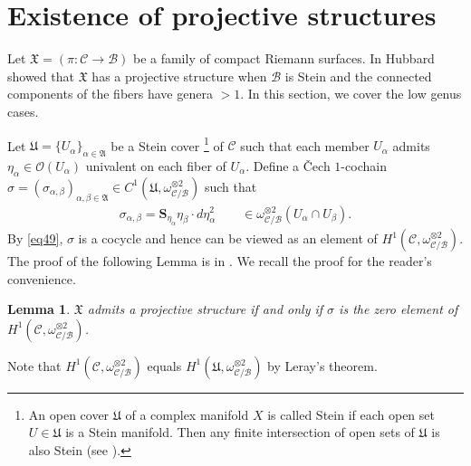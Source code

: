 \documentclass[12pt,a4paper,notitlepage]{article}
\theoremstyle{definition}
\theoremstyle{plain}
\newtheorem{lm}[df]{Lemma}
\newcommand{\fk}{\mathfrak}
\newcommand{\mc}{\mathcal}
\newcommand{\scr}{\mathscr}
\newcommand{\Sbf}{\mathbf{S}}
\numberwithin{equation}{section}
\begin{document}
\section{Existence of projective structures}\label{lb27}


Let $\fk X=(\pi:\mc C\rightarrow\mc B)$ be a family of compact Riemann surfaces. In \cite[Lemma 5]{Hub81} Hubbard showed that $\fk X$ has a projective structure when $\mc B$ is Stein and the connected components of the fibers have genera $>1$. In this section, we cover the low genus cases.

Let $\fk U=\{U_\alpha\}_{\alpha\in\fk A}$ be a Stein cover \footnote{An open cover $\fk U$ of a complex manifold $X$ is called Stein if each open set $U\in\fk U$ is a Stein manifold. Then any finite intersection of open sets of $\fk U$ is also Stein (see \cite[Sec. 1.4.4]{GR84}).} of $\mc C$ such that each member $U_\alpha$ admits $\eta_\alpha\in\scr O(U_\alpha)$ univalent on each fiber of $U_\alpha$. Define a \v Cech $1$-cochain $\sigma=(\sigma_{\alpha,\beta})_{\alpha,\beta\in\fk A}\in C^1(\fk U,\omega_{\mc C/\mc B}^{\otimes 2})$ such that 
\begin{align*}
\sigma_{\alpha,\beta}=\Sbf_{\eta_\alpha}\eta_\beta\cdot d\eta_\alpha^2\qquad \in\omega_{\mc C/\mc B}^{\otimes 2}(U_\alpha\cap U_\beta).
\end{align*}
By \eqref{eq49}, $\sigma$ is a cocycle and hence can be viewed as an element of $H^1(\mc C,\omega_{\mc C/\mc B}^{\otimes 2})$. The proof of the following Lemma is in \cite[Lemma 5]{Hub81}. We recall the proof for the reader's convenience.

\begin{lm}\label{lb26}
	$\fk X$ admits a projective structure if and only if $\sigma$ is the zero element of $H^1(\mc C,\omega_{\mc C/\mc B}^{\otimes 2})$.
\end{lm}

Note that $H^1(\mc C,\omega_{\mc C/\mc B}^{\otimes 2})$ equals $H^1(\fk U,\omega_{\mc C/\mc B}^{\otimes 2})$ by Leray's theorem.
\end{document}
